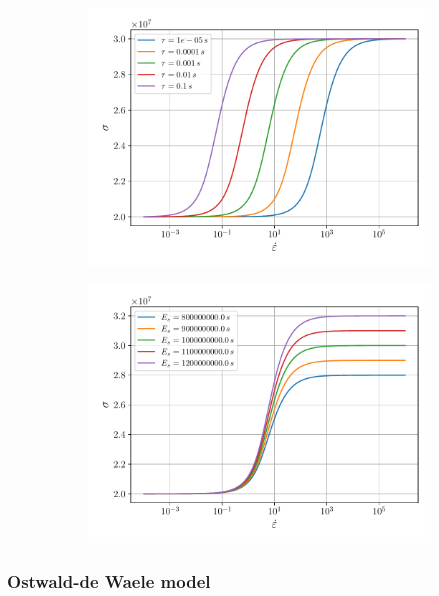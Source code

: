 \documentclass[12pt]{article}
\begin{document}
\begin{figure}[!htb]
	\begin{subfigure}{0.48\textwidth}
		\centering
		\includegraphics[width=\linewidth]{e-dot-stress-tau}
	\end{subfigure}
	\begin{subfigure}{0.48\textwidth}
		\centering
		\includegraphics[width=\linewidth]{e-dot-stress-E}
	\end{subfigure}

\end{figure}

\subsubsection{Ostwald-de Waele model}
\end{document}
